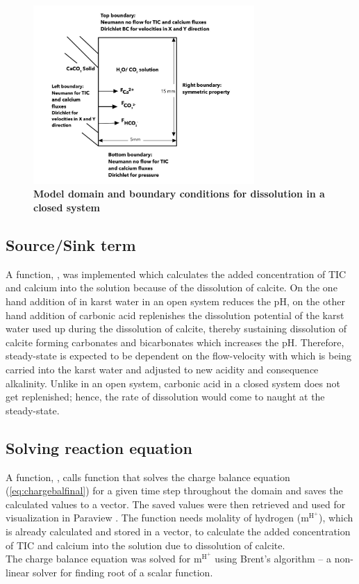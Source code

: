 \begin{figure}
    \centering
    \includegraphics[width=0.75\textwidth]{PICTURES/closed_system.jpg}
    \caption [Model domain and boundary conditions for  dissolution in a closed system] {\textbf{Model domain and boundary conditions for  dissolution in a closed system}}
    \label{fig:ClosedSystem}       %
\end{figure}
 

\subsection{Source/Sink term} A function, , was implemented which calculates the added concentration of 
TIC and calcium into the solution because of the dissolution of calcite. On the one hand addition of  in karst water in an open system 
reduces the pH, on the other hand addition of carbonic acid replenishes the dissolution potential of the karst water used up  
during the dissolution of calcite, thereby sustaining dissolution of calcite forming carbonates and bicarbonates which increases the pH. 
Therefore, steady-state is expected to be dependent on the flow-velocity with which  is being carried into the karst water 
and adjusted to new acidity and consequence alkalinity. Unlike in an open system, carbonic acid in a closed system does not get 
replenished; hence, the rate of dissolution would come to naught at the steady-state. 


\subsection{Solving reaction equation} A function, , calls  function that solves the charge 
balance equation (\ref{eq:chargebalfinal}) for a given time step throughout the domain and saves the calculated values to a vector. 
The saved values were then retrieved and used for visualization in Paraview \cite{ahrens2005paraview}. The function  needs molality of 
hydrogen ($\mathrm{m^{H^+}}$), which is already calculated and stored in a vector, to calculate the added concentration of TIC 
and calcium into the solution due to dissolution of calcite. \\
The charge balance equation was solved for $\mathrm{m^{H^+}}$ using Brent's algorithm \cite{brent1971algorithm} -- a non-linear solver 
for finding root of a scalar function. 


